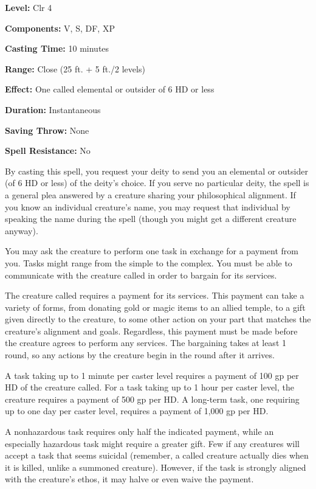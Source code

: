 \documentclass{article}
\begin{document}
\textbf{Level:} Clr 4

\textbf{Components:} V, S, DF, XP

\textbf{Casting Time:} 10 minutes

\textbf{Range:} Close (25 ft. + 5 ft./2 levels)

\textbf{Effect:} One called elemental or outsider of 6 HD or less

\textbf{Duration:} Instantaneous

\textbf{Saving Throw:} None

\textbf{Spell Resistance:} No

By casting this spell, you request your deity to send you an elemental or outsider 
(of 6 HD or less) of the deity's choice. If you serve no particular deity, the 
spell is a general plea answered by a creature sharing your philosophical alignment. 
If you know an individual creature's name, you may request that individual by speaking 
the name during the spell (though you might get a different creature anyway).

You may ask the creature to perform one task in exchange for a payment from you. 
Tasks might range from the simple to the complex. You must be able to communicate 
with the creature called in order to bargain for its services.

The creature called requires a payment for its services. This payment can take 
a variety of forms, from donating gold or magic items to an allied temple, to a 
gift given directly to the creature, to some other action on your part that matches 
the creature's alignment and goals. Regardless, this payment must be made before 
the creature agrees to perform any services. The bargaining takes at least 1 round, 
so any actions by the creature begin in the round after it arrives.

A task taking up to 1 minute per caster level requires a payment of 100 gp per 
HD of the creature called. For a task taking up to 1 hour per caster level, the 
creature requires a payment of 500 gp per HD. A long-term task, one requiring up 
to one day per caster level, requires a payment of 1,000 gp per HD.

A nonhazardous task requires only half the indicated payment, while an especially 
hazardous task might require a greater gift. Few if any creatures will accept a 
task that seems suicidal (remember, a called creature actually dies when it is 
killed, unlike a summoned creature). However, if the task is strongly aligned with 
the creature's ethos, it may halve or even waive the payment. 
\end{document}
